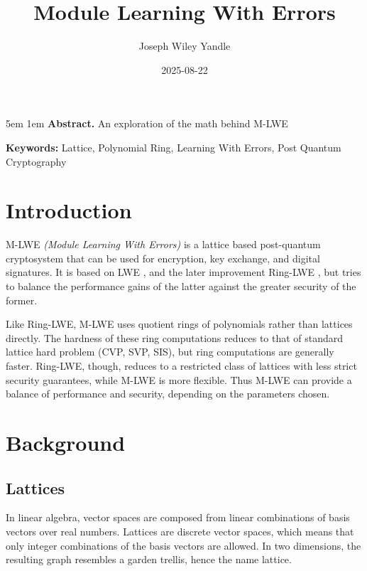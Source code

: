 \documentclass{article}
\title{Module Learning With Errors}
\date{2025-08-22}
\author{Joseph Wiley Yandle}
\begin{document}
\onecolumn
\maketitle

\begingroup
\leftskip5em
\parskip1em
\rightskip\leftskip
\noindent\textbf{Abstract.} An exploration of the math behind M-LWE

\par
\noindent\textbf{Keywords:} Lattice, Polynomial Ring, Learning With Errors, Post Quantum Cryptography
\par
\endgroup

\section{
  Introduction
}

M-LWE \emph{(Module Learning With Errors)} \cite{mlwe} is a lattice based post-quantum cryptosystem that can be used for encryption, key exchange, and digital signatures.  It is based on LWE \cite{lwe}, and the later improvement Ring-LWE \cite{ringlwe}, but tries to balance the performance gains of the latter against the greater security of the former.

Like Ring-LWE, M-LWE uses quotient rings of polynomials rather than lattices directly.  The hardness of these ring computations reduces to that of standard lattice hard problem (CVP, SVP, SIS), but ring computations are generally faster.  Ring-LWE, though, reduces to a restricted class of lattices with less strict security guarantees, while M-LWE is more flexible.  Thus M-LWE can provide a balance of performance and security, depending on the parameters chosen.

\section{
  Background
}

\subsection{
  Lattices
}

In linear algebra, vector spaces are composed from linear combinations of basis vectors over real numbers.  Lattices are discrete vector spaces, which means that only integer combinations of the basis vectors are allowed.  In two dimensions, the resulting graph resembles a garden trellis, hence the name lattice.
\end{document}
